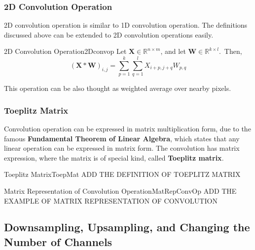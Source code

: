 \documentclass{article}
\begin{document}
        \subsubsection{2D Convolution Operation}
            2D convolution operation is similar to 1D convolution operation.
            The definitions discussed above can be extended to 2D convolution operations easily.
            \begin{defn}{2D Convolution Operation}{2Dconvop}
                Let $\textbf{X}\in\mathbb{R}^{n \times m}$, and let $\textbf{W}\in\mathbb{R}^{k \times l}$.\
                Then, 
                \[
                (\textbf{X} \ast \textbf{W})_{i,j}=
                \sum_{p=1}^{k}\sum_{q=1}^{l}X_{i+p, j+q}W_{p, q}
                \]
            \end{defn}
            This operation can be also thought as weighted average over nearby pixels.

        \subsubsection{Toeplitz Matrix}
            Convolution operation can be expressed in matrix multiplication form, due to the famous
            \textbf{Fundamental Theorem of Linear Algebra}, which states that any linear operation can be expressed in matrix form.
            The convolution has matrix expression, where the matrix is of special kind, called \textbf{Toeplitz matrix}.
            \begin{defn}{Toeplitz Matrix}{ToepMat}
                ADD THE DEFINITION OF TOEPLITZ MATRIX
            \end{defn}

            \begin{exm}{Matrix Representation of Convolution Operation}{MatRepConvOp}
                ADD THE EXAMPLE OF MATRIX REPRESENTATION OF CONVOLUTION
            \end{exm}
        
    \subsection{Downsampling, Upsampling, and Changing the Number of Channels}
\end{document}
